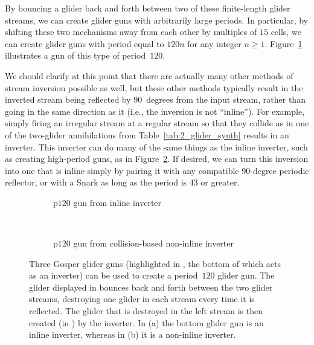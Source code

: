 By bouncing a glider back and forth between two of these finite-length glider streams, we can create glider guns with arbitrarily large periods. In particular, by shifting these two mechanisms away from each other by multiples of $15$ cells, we can create glider guns with period equal to $120n$ for any integer $n \geq 1$. Figure~\ref{fig:inline_inverter_p120_gun} illustrates a gun of this type of period~$120$.

We should clarify at this point that there are actually many other methods of stream inversion possible as well, but these other methods typically result in the inverted stream being reflected by $90$~degrees from the input stream, rather than going in the same direction as it (i.e., the inversion is not ``inline''). For example, simply firing an irregular stream at a regular stream so that they collide as in one of the two-glider annihilations from Table~\ref{tab:2_glider_synth} results in an inverter. This inverter can do many of the same things as the inline inverter, such as creating high-period guns, as in Figure~\ref{fig:inverter_p120_gun}. If desired, we can turn this inversion into one that is inline simply by pairing it with any compatible 90-degree periodic reflector, or with a Snark as long as the period is $43$ or greater.

\begin{figure}[!htb]
	\centering
	\begin{subfigure}{.48\textwidth}
		\centering
		\caption{p$120$ gun from inline inverter}
		\label{fig:inline_inverter_p120_gun}
	\end{subfigure} \ \ \ %
	\begin{subfigure}{.49\textwidth}
		\centering
		\caption{p$120$ gun from collision-based non-inline inverter}
		\label{fig:inverter_p120_gun}
	\end{subfigure}
	\caption{Three Gosper glider guns (highlighted in , the bottom of which acts as an inverter) can be used to create a period~$120$ glider gun. The glider displayed in  bounces back and forth between the two  glider streams, destroying one glider in each stream every time it is reflected. The glider that is destroyed in the left stream is then created (in ) by the inverter. In (a) the bottom glider gun is an inline inverter, whereas in (b) it is a non-inline inverter.}\label{fig:inverter_p120_gun_inline_and_not}
\end{figure}

